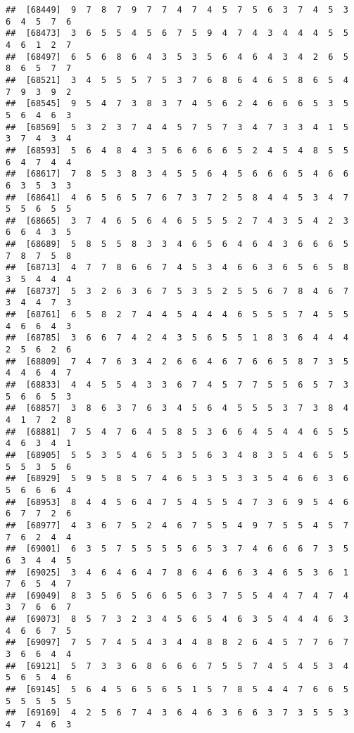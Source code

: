 \documentclass[
]{book}
\begin{document}
\begin{verbatim}
##  [68449]  9  7  8  7  9  7  7  4  7  4  5  7  5  6  3  7  4  5  3  6  4  5  7  6
##  [68473]  3  6  5  5  4  5  6  7  5  9  4  7  4  3  4  4  4  5  5  4  6  1  2  7
##  [68497]  6  5  6  8  6  4  3  5  3  5  6  4  6  4  3  4  2  6  5  8  6  5  7  7
##  [68521]  3  4  5  5  5  7  5  3  7  6  8  6  4  6  5  8  6  5  4  7  9  3  9  2
##  [68545]  9  5  4  7  3  8  3  7  4  5  6  2  4  6  6  6  5  3  5  5  6  4  6  3
##  [68569]  5  3  2  3  7  4  4  5  7  5  7  3  4  7  3  3  4  1  5  3  7  4  3  4
##  [68593]  5  6  4  8  4  3  5  6  6  6  6  5  2  4  5  4  8  5  5  6  4  7  4  4
##  [68617]  7  8  5  3  8  3  4  5  5  6  4  5  6  6  6  5  4  6  6  6  3  5  3  3
##  [68641]  4  6  5  6  5  7  6  7  3  7  2  5  8  4  4  5  3  4  7  5  5  6  5  5
##  [68665]  3  7  4  6  5  6  4  6  5  5  5  2  7  4  3  5  4  2  3  6  6  4  3  5
##  [68689]  5  8  5  5  8  3  3  4  6  5  6  4  6  4  3  6  6  6  5  7  8  7  5  8
##  [68713]  4  7  7  8  6  6  7  4  5  3  4  6  6  3  6  5  6  5  8  3  5  4  4  4
##  [68737]  5  3  2  6  3  6  7  5  3  5  2  5  5  6  7  8  4  6  7  3  4  4  7  3
##  [68761]  6  5  8  2  7  4  4  5  4  4  4  6  5  5  5  7  4  5  5  4  6  6  4  3
##  [68785]  3  6  6  7  4  2  4  3  5  6  5  5  1  8  3  6  4  4  4  2  5  6  2  6
##  [68809]  7  4  7  6  3  4  2  6  6  4  6  7  6  6  5  8  7  3  5  4  4  6  4  7
##  [68833]  4  4  5  5  4  3  3  6  7  4  5  7  7  5  5  6  5  7  3  5  6  6  5  3
##  [68857]  3  8  6  3  7  6  3  4  5  6  4  5  5  5  3  7  3  8  4  4  1  7  2  8
##  [68881]  7  5  4  7  6  4  5  8  5  3  6  6  4  5  4  4  6  5  5  4  6  3  4  1
##  [68905]  5  5  3  5  4  6  5  3  5  6  3  4  8  3  5  4  6  5  5  5  5  3  5  6
##  [68929]  5  9  5  8  5  7  4  6  5  3  5  3  3  5  4  6  6  3  6  5  6  6  6  4
##  [68953]  8  4  4  5  6  4  7  5  4  5  5  4  7  3  6  9  5  4  6  6  7  7  2  6
##  [68977]  4  3  6  7  5  2  4  6  7  5  5  4  9  7  5  5  4  5  7  7  6  2  4  4
##  [69001]  6  3  5  7  5  5  5  5  6  5  3  7  4  6  6  6  7  3  5  6  3  4  4  5
##  [69025]  3  4  6  4  6  4  7  8  6  4  6  6  3  4  6  5  3  6  1  7  6  5  4  7
##  [69049]  8  3  5  6  5  6  6  5  6  3  7  5  5  4  4  7  4  7  4  3  7  6  6  7
##  [69073]  8  5  7  3  2  3  4  5  6  5  4  6  3  5  4  4  4  6  3  4  6  6  7  5
##  [69097]  7  5  7  4  5  4  3  4  4  8  8  2  6  4  5  7  7  6  7  3  6  6  4  4
##  [69121]  5  7  3  3  6  8  6  6  6  7  5  5  7  4  5  4  5  3  4  5  6  5  4  6
##  [69145]  5  6  4  5  6  5  6  5  1  5  7  8  5  4  4  7  6  6  5  5  5  5  5  5
##  [69169]  4  2  5  6  7  4  3  6  4  6  3  6  6  3  7  3  5  5  3  4  7  4  6  3

\end{verbatim}
\end{document}
